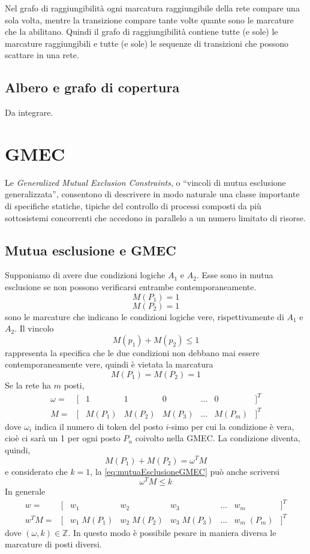 \documentclass[a4paper]{report}
\begin{document}
Nel grafo di raggiungibilit\`a ogni marcatura raggiungibile della rete
compare una sola volta, mentre la transizione compare tante volte
quante sono le marcature che la abilitano. Quindi il grafo di
raggiungibilit\`a contiene tutte (e sole) le marcature raggiungibili e
tutte (e sole) le sequenze di transizioni che possono scattare in una
rete.

\subsection{Albero e grafo di copertura}
Da integrare.

\section{GMEC}
Le {\em Generalized Mutual Exclusion Constraints},
o ``vincoli di mutua esclusione generalizzata'', consentono di
descrivere in modo naturale una classe importante di specifiche
statiche, tipiche del controllo di processi composti da pi\`u
sottosistemi concorrenti che accedono in parallelo a un numero
limitato di risorse. 

\subsection{Mutua esclusione e GMEC}
Supponiamo di avere due condizioni logiche $A_1$ e $A_2$. Esse sono in
mutua esclusione se non possono verificarsi entrambe
contemporaneamente.
\[
M(P_1) = 1
\]
\[
M(P_2) = 1
\]
sono le marcature che indicano le condizioni logiche vere,
rispettivamente di $A_1$ e $A_2$. Il vincolo
\begin{equation}\label{eq:mutuaEsclusioneGMEC}
M(p_1) + M(p_2) \leq 1
\end{equation}
rappresenta la specifica che le due condizioni non debbano mai essere
contemporaneamente vere, quindi \`e vietata la marcatura
\[
M(P_1) = M(P_2) = 1
\]
Se la rete ha $m$ posti,
\[
\begin{array}{cccccccc}
  \omega = & [ & 1 & 1 & 0 & ... & 0 & ]^T\\
  M = & [ & M(P_1) & M(P_2) & M(P_3) & ... & M(P_m) & ]^T
\end{array}
\]
dove $\omega_i$ indica il numero di token del posto $i$-simo per cui la
condizione \`e vera, cio\`e ci sar\`a un 1 per ogni posto $P_n$
coivolto nella GMEC. La condizione diventa, quindi,
\[
M(P_1) + M(P_2) = \omega^T M
\]
e considerato che $k = 1$, la \ref{eq:mutuaEsclusioneGMEC} pu\`o anche
scriversi
\begin{equation}
  \omega^T M \leq k
\end{equation}
In generale
\[
\begin{array}{cccccccc}
  w = & [ & w_1 & w_2 & w_3 & ... & w_m & ]^T\\
  w^T M = & [ & w_1\;M(P_1) & w_2\;M(P_2) & w_3\;M(P_3) & ... & w_m\;(P_m) & ]^T
\end{array}
\]
dove $(\omega,k) \in \mathbb{Z}$. In questo modo \`e possibile pesare in
maniera diversa le marcature di posti diversi.
\end{document}
